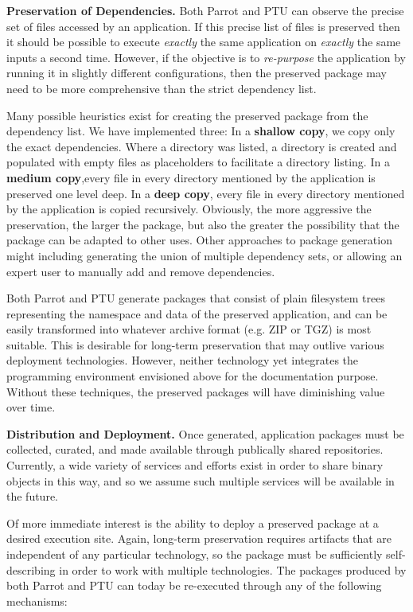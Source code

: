 {\bf Preservation of Dependencies.}  Both Parrot and PTU can observe the precise
set of files accessed by an application.  If this precise list of files is preserved
then it should be possible to execute
\emph{exactly} the same application on \emph{exactly} the same inputs a second
time.  However, if the objective is to \emph{re-purpose} the application by running it in slightly different configurations, then the preserved package may need to
be more comprehensive than the strict dependency list.

Many possible heuristics exist for creating the preserved package
from the dependency list.  We have implemented three:
In a {\bf shallow copy}, we copy only
the exact dependencies.  Where a directory was listed, a directory is created and populated with empty files as placeholders to facilitate a directory listing.  In a {\bf medium copy},every file in every directory mentioned by the application is preserved one level deep.  In a {\bf deep copy}, every file in every directory mentioned by the application is copied recursively.  Obviously, the more aggressive the preservation, the larger the package, but also the greater the possibility that the package can be adapted to other uses.  Other approaches to package generation might including generating the union
of multiple dependency sets, or allowing an expert user to manually add
and remove dependencies.

Both Parrot and PTU generate packages that consist of plain filesystem trees representing the namespace and data of the preserved application, and can be easily transformed into whatever archive format (e.g. ZIP or TGZ) is most suitable.  This is desirable for long-term preservation that may outlive various deployment technologies.
However, neither technology yet integrates the programming environment envisioned above for the documentation purpose.  Without these techniques, the preserved packages will have diminishing value over time.

{\bf Distribution and Deployment.}
Once generated, application packages must be collected, curated, and made
available through publically shared repositories.  Currently, a 
wide variety of services and efforts exist in order to share binary objects in this way,
and so we assume such multiple services will be available in the future.

Of more immediate interest is the ability to deploy a preserved
package at a desired execution site.  Again, long-term preservation
requires artifacts that are independent of any particular technology,
so the package must be sufficiently self-describing in order
to work with multiple technologies.  The packages produced by both Parrot and PTU
can today be re-executed through any of the following mechanisms:

